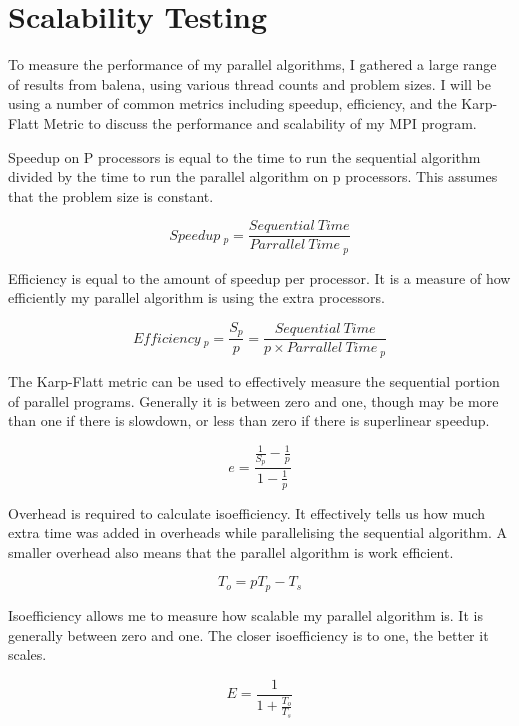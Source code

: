 \documentclass{report}
\begin{document}
\chapter{Scalability Testing}
To measure the performance of my parallel algorithms, I gathered a large range of results from balena, using various thread counts and problem sizes. I will be using a number of common metrics including speedup, efficiency, and the Karp-Flatt Metric to discuss the performance and scalability of my MPI program.\newline

Speedup on P processors is equal to the time to run the sequential algorithm divided by the time to run the parallel algorithm on p processors. This assumes that the problem size is constant.

$$Speedup\ _p=\frac{Sequential\ Time}{Parrallel\ Time\ _p}$$

Efficiency is equal to the amount of speedup per processor. It is a measure of how efficiently my parallel algorithm is using the extra processors.

$$Efficiency\ _p=\frac{S_p}{p}=\frac{Sequential\ Time}{p\times Parrallel\ Time\ _p}$$\newline

The Karp-Flatt metric can be used to effectively measure the sequential portion of parallel programs. Generally it is between zero and one, though may be more than one if there is slowdown, or less than zero if there is superlinear speedup.\newline

$$e=\frac{\frac{1}{S_p}-\frac{1}{p}}{1-\frac{1}{p}}$$\newline

Overhead is required to calculate isoefficiency. It effectively tells us how much extra time was added in overheads while parallelising the sequential algorithm. A smaller overhead also means that the parallel algorithm is work efficient.\newline

$$T_o=pT_p - T_s$$\newline

Isoefficiency allows me to measure how scalable my parallel algorithm is. It is generally between zero and one. The closer isoefficiency is to one, the better it scales.\newline

$$E=\frac{1}{1+\frac{T_o}{T_s}}$$\newline
\end{document}
